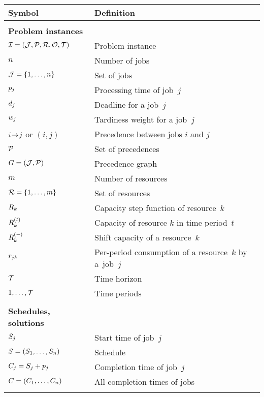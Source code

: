  \label{sec:notation}

\begin{table}[h!]
    \centering
    \begin{tabularx}{\textwidth}{lX}
        \textbf{Symbol} & \textbf{Definition} \\
        \hline
        \\

        \textbf{Problem instances}      & \cellrule \\
        $\mathcal{I} = (\mathcal{J}, \mathcal{P}, \mathcal{R}, \mathcal{O}, \mathcal{T})$ & Problem instance \\
        $n$                             & Number of jobs \\
        $\mathcal{J} = \{ 1, \dots, n \}$     & Set of jobs \\
        $p_{j}$                  & Processing time of job~$j$ \\
        $d_{j}$                  & Deadline for a job~$j$ \\
        $w_{j}$           & Tardiness weight for a job~$j$ \\
        $i \hspace{-0.2em} \rightarrow \hspace{-0.2em} j$ or $(i,j)$  & Precedence between jobs $i$ and $j$ \\
        $\mathcal{P}$                  & Set of precedences \\
        $G = (\mathcal{J}, \mathcal{P})$     & Precedence graph \\
        $m$                             & Number of resources \\
        $\mathcal{R} = \{1, \dots, m\}$  & Set of resources \\
        $R_{k}$                 & Capacity step function of resource~$k$ \\
        $\capacity{k}{t}$               & Capacity of resource $k$ in time period~$t$ \\
        $\shiftcapacity{k}$             & Shift capacity of a resource~$k$ \\
        $r_{j k}$            & Per-period consumption of a resource~$k$ by a~job~$j$ \\
        $\mathcal{T}$                      & Time horizon \\
        $1, \dots, \mathcal{T}$            & Time periods \\
        \\

        \textbf{Schedules, solutions}   & \cellrule \\
        $S_{j}$                                      & Start time of job~$j$ \\
        $S = (S_{1}, \dots, S_{n})$   & Schedule \\
        $C_{j} = S_{j} + p_{j}$          & Completion time of job~$j$ \\
        $C = (C_{1}, \dots, C_{n})$    & All completion times of jobs \\
        \\


\end{tabularx}
\end{table}
